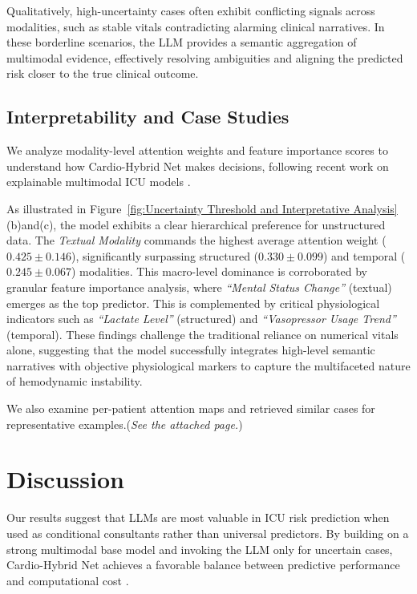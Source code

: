 \documentclass{article}
\begin{document}
Qualitatively, high-uncertainty cases often exhibit conflicting signals across modalities, such as stable vitals contradicting alarming clinical narratives. In these borderline scenarios, the LLM provides a semantic aggregation of multimodal evidence, effectively resolving ambiguities and aligning the predicted risk closer to the true clinical outcome.

\subsection{Interpretability and Case Studies}

We analyze modality-level attention weights and feature importance scores to understand how Cardio-Hybrid Net makes decisions, following recent work on explainable multimodal ICU models \cite{XAI2023MultimodalICU}.

As illustrated in Figure~\ref{fig:Uncertainty Threshold and Interpretative Analysis}(b)and(c), the model exhibits a clear hierarchical preference for unstructured data. The \textit{Textual Modality} commands the highest average attention weight ($0.425 \pm 0.146$), significantly surpassing structured ($0.330 \pm 0.099$) and temporal ($0.245 \pm 0.067$) modalities. This macro-level dominance is corroborated by granular feature importance analysis, where \textit{``Mental Status Change''} (textual) emerges as the top predictor. This is complemented by critical physiological indicators such as \textit{``Lactate Level''} (structured) and \textit{``Vasopressor Usage Trend''} (temporal). These findings challenge the traditional reliance on numerical vitals alone, suggesting that the model successfully integrates high-level semantic narratives with objective physiological markers to capture the multifaceted nature of hemodynamic instability.

We also examine per-patient attention maps and retrieved similar cases for representative examples.(\textit{See the attached page.})

\section{Discussion}

Our results suggest that LLMs are most valuable in ICU risk prediction when used as conditional consultants rather than universal predictors.
By building on a strong multimodal base model and invoking the LLM only for uncertain cases, Cardio-Hybrid Net achieves a favorable balance between predictive performance and computational cost \cite{Gal2016DropoutUncertainty,Griot2025LLMImplementationEHR,Lin2025LLMHealthcareRoles}.
\end{document}
